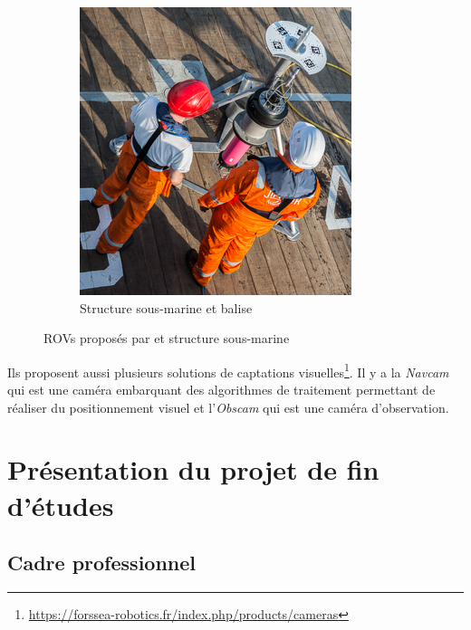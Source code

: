 \begin{figure}[!htb]
\begin{subfigure}[t]{0.3\textwidth}
					\caption{\atoll{}}
				\end{subfigure}
				\hfill
				\begin{subfigure}[t]{0.3\textwidth}
					\centering
					\includegraphics[width=\textwidth]{imgs/frame.png}
					\caption{Structure sous-marine et balise}
				\end{subfigure}
				\caption{\gls{ROV}s proposés par \forssea{} et structure sous-marine}
				\label{fig:ROVs}
			\end{figure}

			Ils proposent aussi plusieurs solutions de captations visuelles\footnote{\url{https://forssea-robotics.fr/index.php/products/cameras}}. Il y a la \textit{Navcam} qui est une caméra embarquant des algorithmes de traitement permettant de réaliser du positionnement visuel et l'\textit{Obscam} qui est une caméra d'observation.

	\section[Projet de fin d'études]{Présentation du projet de fin d'études}

		\subsection{Cadre professionnel}

